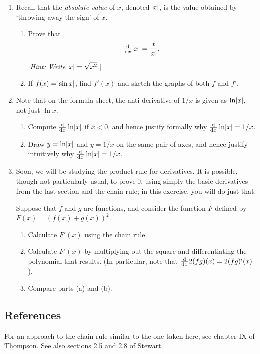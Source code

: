 \begin{enumerate}
  \item Recall that the \emph{absolute value} of $ x $, denoted $ \abs{x} $, is the value obtained by `throwing away the sign' of $ x $.
    \begin{enumerate}
      \item Prove that
            \begin{displaymath}
              \od{}{x} \abs{x} = \frac{x}{\abs{x}}.
            \end{displaymath}
            [\textit{Hint: Write $ \abs{x} = \sqrt{x^2} $.}]
      \item If $ f(x) = \abs{\sin x} $, find $ f'(x) $ and sketch the graphs of both $ f $ and $ f' $.
    \end{enumerate}
  \item Note that on the formula sheet, the anti-derivative of $ 1/x $ is given as $ \ln \abs{x} $, not just $ \ln x $.
    \begin{enumerate}
      \item Compute $ \od{}{x} \ln \abs{x} $ if $ x < 0 $, and hence justify formally why $ \od{}{x} \ln \abs{x} = 1/x $.
      \item Draw $ y = \ln \abs{x} $ and $ y = 1/x $ on the same pair of axes, and hence justify intuitively why $ \od{}{x} \ln \abs{x} = 1/x $.
    \end{enumerate}
  \item Soon, we will be studying the product rule for derivatives. It is possible, though not
        particularly usual, to prove it using simply the basic derivatives from the last section and the chain
        rule; in this exercise, you will do just that.

        Suppose that $ f $ and $ g $ are functions, and consider the function $ F $ defined by $ F(x) = \left(f(x) + g(x)\right)^2 $.
    \begin{enumerate}
      \item Calculate $ F'(x) $ using the chain rule.
      \item Calculate $ F'(x) $ by multiplying out the square and differentiating the polynomial that results. (In particular, note
            that $ \od{}{x} 2(fg)(x) = 2 (fg)'(x) $).
      \item Compare parts (a) and (b).
    \end{enumerate}
\end{enumerate}

\subsection{References}
For an approach to the chain rule similar to the one taken here, see chapter IX of Thompson. See also sections 2.5 and 2.8 of Stewart.

